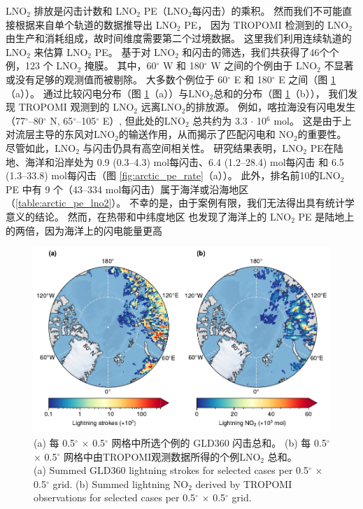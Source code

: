 LNO$_2$ 排放是闪击计数和 LNO$_2$ PE（LNO$_2$每闪击）的乘积。
然而我们不可能直接根据来自单个轨道的数据推导出 LNO$_2$ PE，
因为 TROPOMI 检测到的 LNO$_2$ 由生产和消耗组成，故时间维度需要第二个过境数据。
这里我们利用连续轨道的 LNO$_2$ 来估算 LNO$_2$ PE。
基于对 LNO$_2$ 和闪击的筛选，我们共获得了46个个例，123 个 LNO$_2$ 掩膜。
其中，60$^{\circ}$ W 和 180$^{\circ}$ W 之间的个例由于 LNO$_2$ 不显著或没有足够的观测值而被剔除。
大多数个例位于 60$^{\circ}$ E 和 180$^{\circ}$ E 之间（图 \ref{fig:arctic_lno2_production}（a））。
通过比较闪电分布（图 \ref{fig:arctic_lno2_production}（a））与LNO$_2$总和的分布（图 \ref{fig:arctic_lno2_production}（b）），
我们发现 TROPOMI 观测到的 LNO$_2$ 远离LNO$_2$的排放源。
例如，喀拉海没有闪电发生 （77$^{\circ}$--80$^{\circ}$ N, 65$^{\circ}$--105$^{\circ}$ E）,
但此处的LNO$_2$ 总共约为 3.3 $\cdot$ 10$^6$ mol。
这是由于上对流层主导的东风对LNO$_2$的输送作用，从而揭示了匹配闪电和 NO$_2$的重要性。
尽管如此，LNO$_2$ 与闪击仍具有高空间相关性。
研究结果表明，LNO$_2$ PE在陆地、海洋和沿岸处为 0.9 (0.3--4.3) mol每闪击、6.4 (1.2--28.4) mol每闪击 和 6.5 (1.3--33.8) mol每闪击（图 \ref{fig:arctic_pe_rate}（a））。
此外，排名前10的LNO$_2$ PE 中有 9 个（43--334 mol每闪击）属于海洋或沿海地区（\ref{table:arctic_pe_lno2}）。
不幸的是，由于案例有限，我们无法得出具有统计学意义的结论。
然而，在热带和中纬度地区 \citet{Marais.2018,Allen.2019,Bucsela.2019} 也发现了海洋上的 LNO$_2$ PE 是陆地上的两倍，因为海洋上的闪电能量更高\citep{Beirle.2014,Hutchins.2013}

\begin{figure}[htbp]
\centering
\includegraphics[width=15cm]{./figures/arctic_lno2_production.pdf}
\caption{
(a) 每 0.5$^{\circ}$ $\times$ 0.5$^{\circ}$ 网格中所选个例的 GLD360 闪击总和。
(b) 每 0.5$^{\circ}$ $\times$ 0.5$^{\circ}$ 网格中由TROPOMI观测数据所得的个例LNO$_2$ 总和。\\
(a) Summed GLD360 lightning strokes for selected cases per 0.5$^{\circ}$ $\times$ 0.5$^{\circ}$ grid.
(b) Summed lightning NO$_2$ derived by TROPOMI observations for selected cases per 0.5$^{\circ}$ $\times$ 0.5$^{\circ}$ grid.
}
\label{fig:arctic_lno2_production}
\end{figure}

